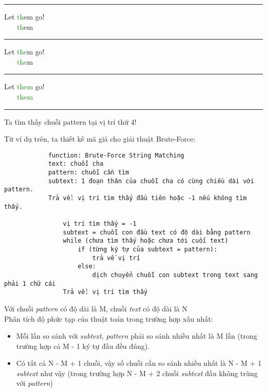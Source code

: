 \documentclass[a4paper,11pt]{article}
\begin{document}
\begin{enumerate}
			\vspace*{2mm}
			\hrule
			Let \textcolor{ForestGreen}{th}em go!\\
			\textcolor{white}{Let }\textcolor{ForestGreen}{th}em
			
			\vspace*{2mm}
			\hrule
			Let \textcolor{ForestGreen}{the}m go!\\
			\textcolor{white}{Let }\textcolor{ForestGreen}{the}m
						
			\vspace*{2mm}
			\hrule
			Let \textcolor{ForestGreen}{them} go!\\
			\textcolor{white}{Let }\textcolor{ForestGreen}{them}
			\vspace*{2mm}
			\hrule

			Ta tìm thấy chuỗi pattern tại vị trí thứ 4!
			
			\vspace*{4mm}
			
			Từ ví dụ trên, ta thiết kế mã giả cho giải thuật Brute-Force:

			\begin{lstlisting}
			function: Brute-Force String Matching
			text: chuỗi cha 
			pattern: chuỗi cần tìm 
			subtext: 1 đoạn thân của chuỗi cha có cùng chiều dài với pattern.
			Trả về: vị trí tìm thấy đầu tiên hoặc -1 nếu không tìm thấy.
			
				vị trí tìm thấy = -1
				subtext = chuỗi con đầu text có độ dài bằng pattern
				while (chưa tìm thấy hoặc chưa tới cuối text)
					if (từng ký tự của subtext = pattern):
						trả về vị trí
					else:
						dịch chuyển chuỗi con subtext trong text sang phải 1 chữ cái
				Trả về: vị trí tìm thấy
					\end{lstlisting}
			
			Với chuỗi \textit{pattern} có độ dài là M, chuỗi \textit{text} có độ dài là N \\
			Phân tích độ phức tạp của thuật toán trong trường hợp xấu nhất:
			\begin{itemize}
				\item Mỗi lần so sánh với \textit{subtext}, \textit{pattern} phải so sánh nhiều nhất là M lần (trong trường hợp cả M - 1 ký tự đầu đều đúng).
				\item Có tất cả N - M + 1 chuỗi, vậy số chuỗi cần so sánh nhiều nhất là N - M + 1 \textit{subtext} như vậy (trong trường hợp N - M + 2 chuỗi \textit{subtext} đầu không trùng với \textit{pattern})
				

\end{itemize}
\end{enumerate}
\end{document}

